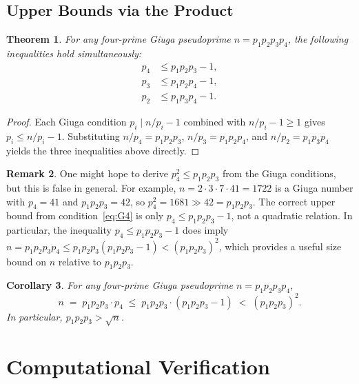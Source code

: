 \documentclass[12pt,a4paper]{amsart}
\newtheorem{theorem}{Theorem}[section]
\newtheorem{corollary}[theorem]{Corollary}
\theoremstyle{definition}
\newtheorem{remark}[theorem]{Remark}
\begin{document}
\subsection{Upper Bounds via the Product}

\begin{theorem}
\label{thm:upper}
For any four-prime Giuga pseudoprime $n = p_1 p_2 p_3 p_4$, the following
inequalities hold simultaneously:
\begin{align}
  p_4 &\le p_1 p_2 p_3 - 1, \label{eq:ub4} \\
  p_3 &\le p_1 p_2 p_4 - 1, \label{eq:ub3} \\
  p_2 &\le p_1 p_3 p_4 - 1. \label{eq:ub2}
\end{align}
\end{theorem}

\begin{proof}
Each Giuga condition $p_i \mid n/p_i - 1$ combined with $n/p_i - 1 \ge 1$
gives $p_i \le n/p_i - 1$.  Substituting $n/p_4 = p_1 p_2 p_3$,
$n/p_3 = p_1 p_2 p_4$, and $n/p_2 = p_1 p_3 p_4$ yields the three
inequalities above directly.
\end{proof}

\begin{remark}
\label{rem:no-square-bound}
One might hope to derive $p_4^2 \le p_1 p_2 p_3$ from the Giuga conditions,
but this is false in general.  For example, $n = 2 \cdot 3 \cdot 7 \cdot 41
= 1722$ is a Giuga number with $p_4 = 41$ and $p_1 p_2 p_3 = 42$,
so $p_4^2 = 1681 \gg 42 = p_1 p_2 p_3$.  The correct upper bound from
condition~\eqref{eq:G4} is only $p_4 \le p_1 p_2 p_3 - 1$, not a quadratic
relation.  In particular, the inequality $p_4 \le p_1 p_2 p_3 - 1$ does
imply $n = p_1 p_2 p_3 p_4 \le p_1 p_2 p_3(p_1 p_2 p_3 - 1) < (p_1 p_2 p_3)^2$,
which provides a useful size bound on $n$ relative to $p_1 p_2 p_3$.
\end{remark}

\begin{corollary}
\label{cor:nbound}
For any four-prime Giuga pseudoprime $n = p_1 p_2 p_3 p_4$,
\[
  n \;=\; p_1 p_2 p_3 \cdot p_4 \;\le\; p_1 p_2 p_3 \cdot (p_1 p_2 p_3 - 1)
  \;<\; (p_1 p_2 p_3)^2.
\]
In particular, $p_1 p_2 p_3 > \sqrt{n}$.
\end{corollary}

\section{Computational Verification}
\label{sec:computation}
\end{document}
